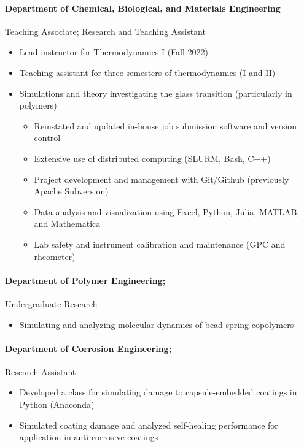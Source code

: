 \documentclass{my_cv}
\begin{document}
\paragraph{Department of Chemical, Biological, and Materials Engineering\\}
Teaching Associate; Research and Teaching Assistant
\begin{itemize}
    \item Lead instructor for Thermodynamics I (Fall 2022)
    \item Teaching assistant for three semesters of thermodynamics (I and II)
    \item Simulations and theory investigating the glass transition (particularly in polymers)
    \begin{itemize}
        \item Reinstated and updated in-house job submission software and version control
        \item Extensive use of distributed computing (SLURM, Bash, C++)
        \item Project development and management with Git/Git\-hub (previously Apache Subversion)
        \item Data analysis and visualization using Excel, Python, Julia, MATLAB, and Math\-e\-ma\-ti\-ca
        \item Lab safety and instrument calibration and maintenance (GPC and rheometer)
    \end{itemize}
\end{itemize}

\paragraph{Department of Polymer Engineering;}
Undergraduate Research
\begin{itemize}
    \item Simulating and analyzing molecular dynamics of bead-spring co\-polymers
\end{itemize}

\paragraph{Department of Corrosion Engineering;}
Research Assistant
\begin{itemize}
    \item Developed a class for simulating damage to capsule-embedded coatings in Python (Anaconda)
    \item Simulated coating damage and analyzed self-healing performance for application in anti-corrosive coatings
\end{itemize}
\end{document}
